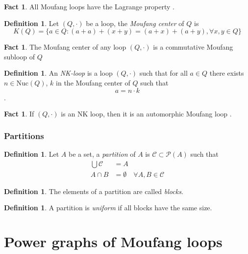 \documentclass[12pt]{report}
\theoremstyle{definition}
\newtheorem{fct}[thm]{Fact}
\newtheorem{dfn}[thm]{Definition}
\newcommand{\nuc}{\text{Nuc}}       %
\begin{document}
\begin{fct}
  All Moufang loops have the Lagrange property \cite{LG}. 
\end{fct}

\begin{dfn}
  Let $(Q,\cdot)$ be a loop, the \emph{Moufang center} of $Q$ is
  \[K(Q) = \{a\in Q : (a + a) + (x + y) = (a + x) + (a + y),\forall x, y\in Q\}\]\cite{KepkaKinyonPhillips}
\end{dfn}

\begin{fct}
  The Moufang center of any loop $(Q, \cdot)$ is a commutative Moufang subloop of $Q$ \cite{Bruck}
\end{fct}

\begin{dfn}
  An \emph{NK-loop} is a loop $(Q, \cdot)$ such that for all $a\in Q$ there exists $n\in \nuc(Q)$, $k$
    in the Moufang center of $Q$ such that
  \[a = n \cdot k\]
  \cite{KepkaKinyonPhillips}.
\end{dfn}

\begin{fct}
  If $(Q,\cdot)$ is an NK loop, then it is an automorphic Moufang loop \cite{KepkaKinyonPhillips}.
\end{fct}

\subsection{Partitions}

\begin{dfn}
  Let $A$ be a set, a \emph{partition} of $A$ is $\mathcal{C}\subset\mathcal{P}(A)$ such that
  \begin{align*}
    \bigcup \mathcal{C} &= A\\
    A\cap B &= \emptyset\quad \forall A, B\in\mathcal{C}
  \end{align*}
\end{dfn}

\begin{dfn}
  The elements of a partition are called \emph{blocks}.
\end{dfn}

\begin{dfn}
  A partition is \emph{uniform} if all blocks have the same size.
\end{dfn}


\chapter{Power graphs of Moufang loops}
\end{document}
